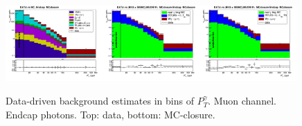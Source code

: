 \begin{figure}[htb]
\begin{center}
   \includegraphics[width=0.33\textwidth]{../figs/figs_v11/MUON_WGamma/PrepareYields/c_TotalDATAvsMC_Endcap__phoEt_MCclosure.png}\includegraphics[width=0.33\textwidth]{../figs/figs_v11/MUON_WGamma/PrepareYields/c_DATAvsBkgPlusSigMCc_MUON_WGamma_TEMPL_CHISO_UNblind_MCclosure__Endcap__phoEt_MCclosure.png}\includegraphics[width=0.33\textwidth]{../figs/figs_v11/MUON_WGamma/PrepareYields/c_DATAvsBkgPlusSigMCc_MUON_WGamma_TEMPL_SIHIH_UNblind_MCclosure__Endcap__phoEt_MCclosure.png}
  \caption{Data-driven background estimates in bins of $P_T^{\gamma}$. Muon channel. Endcap photons. Top: data, bottom: MC-closure. }
  \end{center}
\end{figure}

